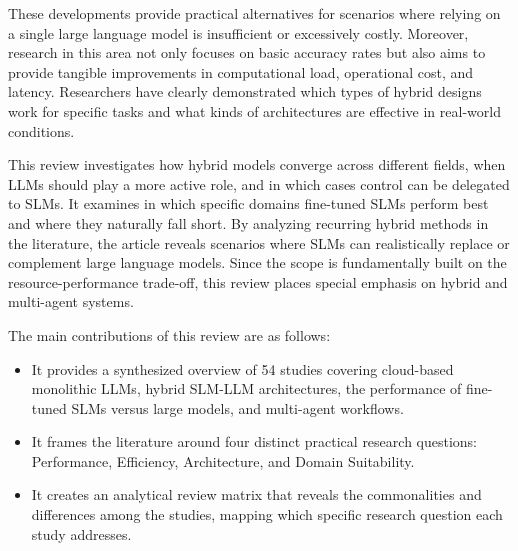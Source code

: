 These developments provide practical alternatives for scenarios where relying on a single large language model is insufficient or excessively costly. Moreover, research in this area not only focuses on basic accuracy rates but also aims to provide tangible improvements in computational load, operational cost, and latency. Researchers have clearly demonstrated which types of hybrid designs work for specific tasks and what kinds of architectures are effective in real-world conditions.

This review investigates how hybrid models converge across different fields, when LLMs should play a more active role, and in which cases control can be delegated to SLMs. It examines in which specific domains fine-tuned SLMs perform best and where they naturally fall short. By analyzing recurring hybrid methods in the literature, the article reveals scenarios where SLMs can realistically replace or complement large language models. Since the scope is fundamentally built on the resource-performance trade-off, this review places special emphasis on hybrid and multi-agent systems.

The main contributions of this review are as follows:
\begin{itemize}
    \item It provides a synthesized overview of 54 studies covering cloud-based monolithic LLMs, hybrid SLM-LLM architectures, the performance of fine-tuned SLMs versus large models, and multi-agent workflows.
    \item It frames the literature around four distinct practical research questions: Performance, Efficiency, Architecture, and Domain Suitability.
    \item It creates an analytical review matrix that reveals the commonalities and differences among the studies, mapping which specific research question each study addresses.
\end{itemize}



